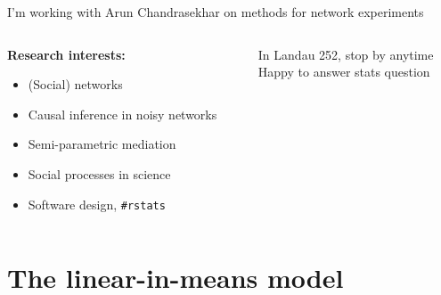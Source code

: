 \documentclass[aspectratio=169]{beamer}
\theoremstyle{remark}
\begin{document}
\begin{frame}{I'm working with Arun Chandrasekhar on methods for network experiments}
    \begin{columns}
        \begin{column}{0.5\textwidth}
            \textbf{Research interests:}
            \begin{itemize}
                \item (Social) networks
                \item Causal inference in noisy networks
                \item Semi-parametric mediation
                \item Social processes in science
                \item Software design, \texttt{\#rstats}
            \end{itemize}
        \end{column}
        \begin{column}{0.5\textwidth}
            In Landau 252, stop by anytime \\    
            \vspace{3mm}
            Happy to answer stats question
        \end{column}
    \end{columns}
\end{frame}

\section{The linear-in-means model}
\end{document}
